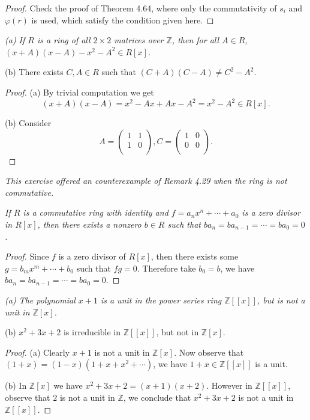 \begin{proof}
Check the proof of Theorem 4.64, where only the commutativity of $s_i$ and $\varphi(r)$ is used, which satisfy the condition given here.
\end{proof}
\begin{problem}\em
(a) If $R$ is a ring of all $2\times 2$ matrices over $\mathbb{Z}$, then for all $A\in R$, $(x+A)(x-A)-x^2-A^2\in R[x]$.\par
(b) There exists $C,A\in R$ such that $(C+A)(C-A)\ne C^2-A^2$.
\end{problem}
\begin{proof}
(a) By trivial computation we get 
$$
\left( x+A \right) \left( x-A \right) =x^2-Ax+Ax-A^2=x^2-A^2\in R\left[ x \right] .
$$\par
(b) Consider 
$$
A=\left( \begin{matrix}
	1&		1\\
	1&		0\\
\end{matrix} \right) ,C=\left( \begin{matrix}
	1&		0\\
	0&		0\\
\end{matrix} \right) .
$$
\end{proof}
\begin{note}\em
This exercise offered an counterexample of Remark 4.29 when the ring is not commutative. 
\end{note}
\begin{problem}\em
If $R$ is a commutative ring with identity and $f=a_nx^n+\cdots+a_0$ is a zero divisor in $R[x]$, then there exists a nonzero $b\in R$ such that $ba_n=ba_{n-1}=\cdots=ba_0=0$.
\end{problem}
\begin{proof}
Since $f$ is a zero divisor of $R[x]$, then there exists some $g=b_mx^m+\cdots+b_0$ such that $fg=0$. Therefore take $b_0=b$, we have $ba_n=ba_{n-1}=\cdots=ba_0=0$.
\end{proof}
\begin{problem}\em
(a) The polynomial $x+1$ is a unit in the power series ring $\mathbb{Z}[[x]]$, but is not a unit in $\mathbb{Z}[x]$.\par
(b) $x^2+3x+2$ is irreducible in $\mathbb{Z}[[x]]$, but not in $\mathbb{Z}[x]$.
\end{problem}
\begin{proof}
(a) Clearly $x+1$ is not a unit in $\mathbb{Z}[x]$. Now observe that $(1+x)=(1-x)(1+x+x^2+\cdots)$, we have $1+x\in\mathbb{Z}[[x]]$ is a unit.\par
(b) In $\mathbb{Z}[x]$ we have $x^2+3x+2=(x+1)(x+2)$. However in $\mathbb{Z}[[x]]$, observe that $2$ is not a unit in $\mathbb{Z}$, we conclude that $x^2+3x+2$ is not a unit in $\mathbb{Z}[[x]]$.
\end{proof}
